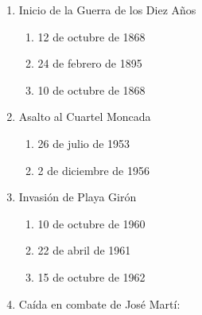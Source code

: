 \documentclass[twocolumn]{article}
\begin{document}
\begin{enumerate}



  \item Inicio de la Guerra de los Diez Años

  \begin{enumerate}
   
   \item 12 de octubre de 1868
   
   \item 24 de febrero de 1895
   
   \item 10 de octubre de 1868
   
  \end{enumerate}



  \item Asalto al Cuartel Moncada

  \begin{enumerate}
   
   \item 26 de julio de 1953
   
   \item 2 de diciembre de 1956
   
  \end{enumerate}



  \item Invasión de Playa Girón

  \begin{enumerate}
   
   \item 10 de octubre de 1960
   
   \item 22 de abril de 1961
   
   \item 15 de octubre de 1962
   
  \end{enumerate}



  \item Caída en combate de José Martí:


\end{enumerate}
\end{document}
